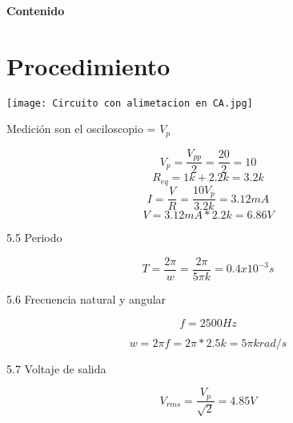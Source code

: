 \documentclass[a4paper, 11pt]{article}
\begin{document}
\textbf{}
\newpage

\begin{flushright}
\textbf{\Huge Contenido}
\end{flushright}

\renewcommand*\contentsname{}
{%
\tableofcontents
}



\newpage

\section{Procedimiento}

\texttt{[image: Circuito con alimetacion en CA.jpg]}

Medición son el osciloscopio = $V_p$

\begin{equation*}
V_p=\frac{V_{pp}}{2}=\frac{20}{2}=10
\end{equation*}
\begin{equation*}
R_{eq}=1k+2.2k=3.2k
\end{equation*}
\begin{equation*}
I=\frac{V}{R}=\frac{10V_p}{3.2k}=3.12 mA
\end{equation*}
\begin{equation*}
V=3.12mA*2.2k=6.86V
\end{equation*}

5.5 Periodo

\begin{equation*}
T=\frac{2\pi}{w}=\frac{2\pi}{5\pi k}=0.4x10^{-3}s
\end{equation*}

5.6 Frecuencia natural y angular

\begin{equation*}
f=2500Hz
\end{equation*}

\begin{equation*}
w=2\pi f=2\pi * 2.5k=5\pi k rad/s
\end{equation*}

5.7 Voltaje de salida

\begin{equation*}
V_{rms}=\frac{V_p}{\sqrt{2}}=4.85 V
\end{equation*}
\end{document}
